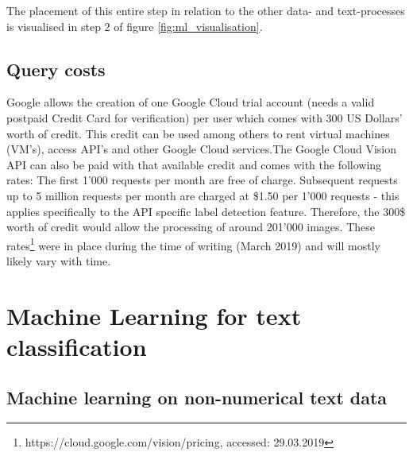 The placement of this entire step in relation to the other data- and text-processes is visualised in step 2 of figure \ref{fig:ml_visualisation}.

\subsection{Query costs} \label{vision_query_cost}
Google allows the creation of one Google Cloud trial account (needs a valid postpaid Credit Card for verification) per user which comes with 300 US Dollars' worth of credit. This credit can be used among others to rent virtual machines (VM's), access API's and other Google Cloud services.The Google Cloud Vision API can also be paid with that available credit and comes with the following rates: The first 1'000 requests per month are free of charge. Subsequent requests up to 5 million requests per month are charged at \$1.50 per 1'000 requests - this applies specifically to the API specific label detection feature. Therefore, the 300\$ worth of credit would allow the processing of around 201'000 images. These rates\footnote{https://cloud.google.com/vision/pricing, accessed: 29.03.2019} were in place during the time of writing (March 2019) and will mostly likely vary with time.

\clearpage

\section{Machine Learning for text classification} 

\subsection{Machine learning on non-numerical text data} \label{ml_text_data}

